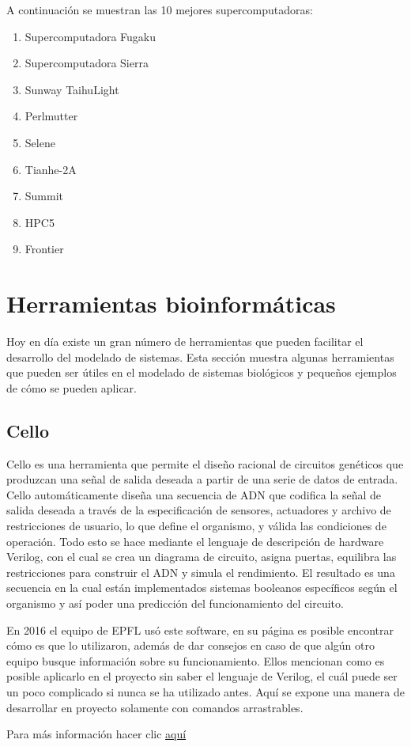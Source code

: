 \documentclass[11pt, letterpaper, spanish]{article}
\begin{document}
{{\par {A continuación se muestran las 10 mejores supercomputadoras:}
\begin{enumerate}[1.]
    \item Supercomputadora Fugaku
    \item Supercomputadora Sierra
    \item Sunway TaihuLight
    \item Perlmutter
    \item Selene
    \item Tianhe-2A
    \item Summit
    \item HPC5
    \item Frontier
\end{enumerate}






\newpage
\section{Herramientas bioinformáticas}
\par{Hoy en día existe un gran número de herramientas que pueden facilitar el desarrollo del modelado de sistemas. Esta sección muestra algunas herramientas que pueden ser útiles en el modelado de sistemas biológicos y pequeños ejemplos de cómo se pueden aplicar.}
    \subsection{Cello}
    \par{Cello es una herramienta que permite el diseño racional de circuitos genéticos que produzcan una señal de salida deseada a partir de una serie de datos de entrada. Cello automáticamente diseña una secuencia de ADN que codifica la señal de salida deseada a través de la especificación de sensores, actuadores y archivo de restricciones de usuario, lo que define el organismo, y válida las condiciones de operación. Todo esto se hace mediante el lenguaje de descripción de hardware Verilog, con el cual se crea un diagrama de circuito, asigna puertas, equilibra las restricciones para construir el ADN y simula el rendimiento. El resultado es una secuencia en la cual están implementados sistemas booleanos específicos según el organismo y así poder una predicción del funcionamiento del circuito.}
    \par{En 2016 el equipo de EPFL usó este software, en su página es posible encontrar cómo es que lo utilizaron, además de dar consejos en caso de que algún otro equipo busque información sobre su funcionamiento. Ellos mencionan como es posible aplicarlo en el proyecto sin saber el lenguaje de Verilog, el cuál puede ser un poco complicado si nunca se ha utilizado antes. Aquí se expone una manera de desarrollar en proyecto solamente con comandos arrastrables.}
    \par{Para más información hacer clic \href{https://2016.igem.org/Team:EPFL/Software_CELLO}{aquí}}
}}
\end{document}
